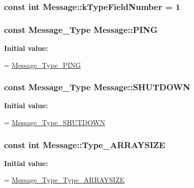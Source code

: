 \subsubsection[{\texorpdfstring{k\+Type\+Field\+Number}{kTypeFieldNumber}}]{\setlength{\rightskip}{0pt plus 5cm}const int Message\+::k\+Type\+Field\+Number = 1\hspace{0.3cm}{\ttfamily [static]}}\hypertarget{class_message_a7e929836116d1d4afdf1048ee821637a}{}\label{class_message_a7e929836116d1d4afdf1048ee821637a}
\subsubsection[{\texorpdfstring{P\+I\+NG}{PING}}]{\setlength{\rightskip}{0pt plus 5cm}const {\bf Message\+\_\+\+Type} Message\+::\+P\+I\+NG\hspace{0.3cm}{\ttfamily [static]}}\hypertarget{class_message_abc34006eaf98f78c4f90767fd89f7216}{}\label{class_message_abc34006eaf98f78c4f90767fd89f7216}
{\bfseries Initial value\+:}
\begin{DoxyCode}
=
    \hyperlink{message_8pb_8h_a1b620cd54f3d6b48f3c5f7979545b160a585150d90c2510e56b92aa0bd8d0d552}{Message\_Type\_PING}
\end{DoxyCode}
\subsubsection[{\texorpdfstring{S\+H\+U\+T\+D\+O\+WN}{SHUTDOWN}}]{\setlength{\rightskip}{0pt plus 5cm}const {\bf Message\+\_\+\+Type} Message\+::\+S\+H\+U\+T\+D\+O\+WN\hspace{0.3cm}{\ttfamily [static]}}\hypertarget{class_message_ad4dfaa2599a7afc20df9fd87b0f09fea}{}\label{class_message_ad4dfaa2599a7afc20df9fd87b0f09fea}
{\bfseries Initial value\+:}
\begin{DoxyCode}
=
    \hyperlink{message_8pb_8h_a1b620cd54f3d6b48f3c5f7979545b160a8e12d42a70a33d4cc5ef06acef830b77}{Message\_Type\_SHUTDOWN}
\end{DoxyCode}
\subsubsection[{\texorpdfstring{Type\+\_\+\+A\+R\+R\+A\+Y\+S\+I\+ZE}{Type_ARRAYSIZE}}]{\setlength{\rightskip}{0pt plus 5cm}const int Message\+::\+Type\+\_\+\+A\+R\+R\+A\+Y\+S\+I\+ZE\hspace{0.3cm}{\ttfamily [static]}}\hypertarget{class_message_afdad43f1f3fd8af53d430fa57b3c85f9}{}\label{class_message_afdad43f1f3fd8af53d430fa57b3c85f9}
{\bfseries Initial value\+:}
\begin{DoxyCode}
=
    \hyperlink{message_8pb_8h_a67b5ea393c8852bab3714524d9d9d7f3}{Message\_Type\_Type\_ARRAYSIZE}
\end{DoxyCode}
